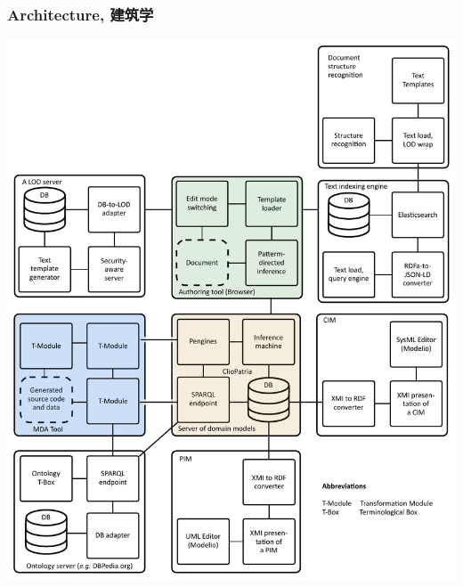 \documentclass[10pt]{beamer}
\begin{document}
\begin{frame}
  \frametitle{Architecture, 建筑学}
  \begin{adjustwidth}{-2.5em}{-2.5em}
    \begin{center}
      \includegraphics[width=0.5\linewidth]{architecture-mda-lod-ext-tot.pdf}
    \end{center}
  \end{adjustwidth}

\end{frame}
\end{document}
